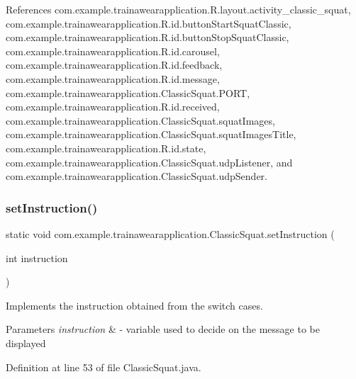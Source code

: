 References com.\+example.\+trainawearapplication.\+R.\+layout.\+activity\+\_\+classic\+\_\+squat, com.\+example.\+trainawearapplication.\+R.\+id.\+button\+Start\+Squat\+Classic, com.\+example.\+trainawearapplication.\+R.\+id.\+button\+Stop\+Squat\+Classic, com.\+example.\+trainawearapplication.\+R.\+id.\+carousel, com.\+example.\+trainawearapplication.\+R.\+id.\+feedback, com.\+example.\+trainawearapplication.\+R.\+id.\+message, com.\+example.\+trainawearapplication.\+Classic\+Squat.\+P\+O\+RT, com.\+example.\+trainawearapplication.\+R.\+id.\+received, com.\+example.\+trainawearapplication.\+Classic\+Squat.\+squat\+Images, com.\+example.\+trainawearapplication.\+Classic\+Squat.\+squat\+Images\+Title, com.\+example.\+trainawearapplication.\+R.\+id.\+state, com.\+example.\+trainawearapplication.\+Classic\+Squat.\+udp\+Listener, and com.\+example.\+trainawearapplication.\+Classic\+Squat.\+udp\+Sender.

\mbox{\label{classcom_1_1example_1_1trainawearapplication_1_1_classic_squat_a3a096fd4064cf28568fd13336c77d28f}} 
\subsubsection{\texorpdfstring{setInstruction()}{setInstruction()}}
{\footnotesize\ttfamily static void com.\+example.\+trainawearapplication.\+Classic\+Squat.\+set\+Instruction (\begin{DoxyParamCaption}\item[{int}]{instruction }\end{DoxyParamCaption})\hspace{0.3cm}{\ttfamily [static]}}



Implements the instruction obtained from the switch cases. 


\begin{DoxyParams}{Parameters}
{\em instruction} & -\/ variable used to decide on the message to be displayed \\
\hline
\end{DoxyParams}


Definition at line 53 of file Classic\+Squat.\+java.


